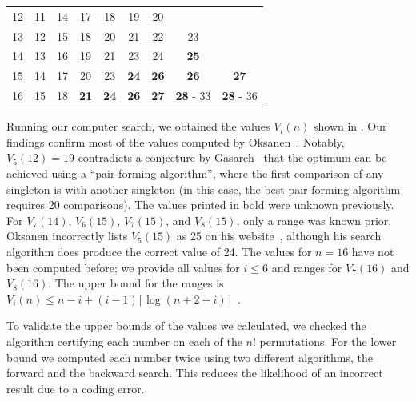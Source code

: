 \documentclass[a4paper,UKenglish,cleveref, autoref, thm-restate, anonymous]{lipics-v2021}
\begin{document}
\begin{table}[!t]
\begin{tabular}{c|cccccccc}
    12  & 11                      & 14 & 17          & 18          & 19          & 20                                                \\
    13  & 12                      & 15 & 18          & 20          & 21          & 22          & 23                                  \\
    14  & 13                      & 16 & 19          & 21          & 23          & 24          & \textbf{25}                         \\
    15  & 14                      & 17 & 20          & 23          & \textbf{24} & \textbf{26} & \textbf{26}      & \textbf{27}      \\
    16  & 15                      & 18 & \textbf{21} & \textbf{24} & \textbf{26} & \textbf{27} & \textbf{28} - 33 & \textbf{28} - 36 \\
  \end{tabular}
\end{table}

Running our computer search, we obtained the values $V_i(n)$ shown in .
Our findings confirm most of the values computed by Oksanen~\cite{Oksanen}.
Notably, $V_5(12) = 19$ contradicts a conjecture by Gasarch~\cite{Gasarch1996} that the optimum can be achieved using a ``pair-forming algorithm'', where the first comparison of any singleton is with another singleton (in this case, the best pair-forming algorithm requires 20 comparisons).
The values printed in bold were unknown previously.
For $V_7(14)$, $V_6(15)$, $V_7(15)$, and $V_8(15)$, only a range was known prior.
Oksanen incorrectly lists $V_5(15)$ as 25 on his website~\cite{Oksanen}, although his search algorithm does produce the correct value of 24.
The values for $n = 16$ have not been computed before; we provide all values for $i \leq 6$ and ranges for $V_7(16)$ and $V_8(16)$.
The upper bound for the ranges is $V_i(n) \le n - i + (i - 1) \lceil \log (n + 2 - i) \rceil$~\cite{hadian1969selecting}.

To validate the upper bounds of the values we calculated, we checked the algorithm certifying each number on each of the $n!$ permutations.
For the lower bound we computed each number twice using two different algorithms, the forward and the backward search.
This reduces the likelihood of an incorrect result due to a coding error.
\end{document}
